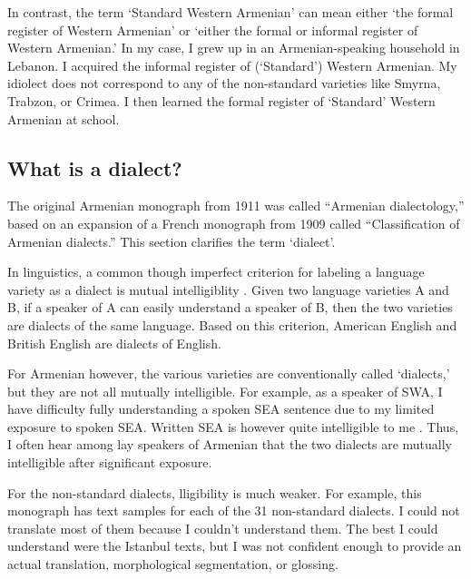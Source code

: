 In contrast, the term `Standard Western Armenian' can mean either `the formal register of Western Armenian' or `either the formal or informal register of Western Armenian.' In my case, I grew up in an Armenian-speaking household in Lebanon. I acquired the informal register of (`Standard') Western Armenian. My idiolect does not correspond to any of the non-standard varieties like Smyrna, Trabzon, or Crimea. I then learned the formal register of `Standard' Western Armenian at school. 









\subsection{What is a dialect?}\label{sec:HossepIntro:armenian:whatisdialect}

The original Armenian monograph from 1911 was called ``Armenian dialectology,'' based on an expansion of a French monograph from 1909 called ``Classification of Armenian dialects.'' This section clarifies the term `dialect'. 


In linguistics, a common though imperfect criterion for labeling a language variety as a dialect is mutual intelligiblity \citep[3]{ChambersTrudgill-1998-Dialectology}. Given two language varieties A and B, if a speaker of A can easily understand a speaker of B, then the two varieties are dialects of the same language. Based on this criterion, American English and British English are dialects of English. 

For Armenian however, the various varieties are conventionally called `dialects,' but they are not all mutually intelligible. For example, as a speaker of SWA, I have difficulty fully understanding a spoken SEA sentence due to my limited exposure to spoken SEA. Written SEA is however quite intelligible to me \citep[cf. intelligibility asymmetries discussed by ][197]{DumTragut-2012-AmenTeghHayGaPluricentricArmenian}. Thus, I often hear among lay speakers of Armenian that the two dialects are mutually intelligible after significant exposure. 

For the non-standard dialects, lligibility is much weaker. For example, this monograph has text samples for each of the 31 non-standard dialects. I could not translate most of them because I couldn't understand them. The best I could understand were the Istanbul texts, but I was not confident enough to provide an actual translation, morphological segmentation, or glossing. 


